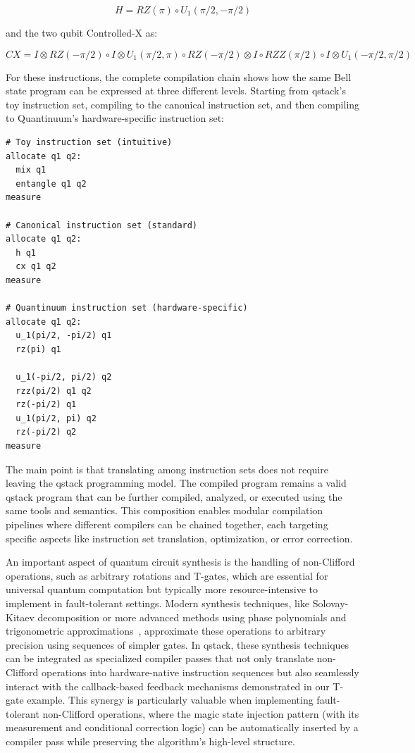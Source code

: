$$H =  RZ(\pi) \circ U_1(\pi/2, -\pi/2) $$

and the two qubit Controlled-X as:

$$CX = I \otimes RZ(-\pi/2) \circ I \otimes U_1(\pi/2, \pi) \circ RZ(-\pi/2) \otimes I \circ RZZ(\pi/2) \circ I \otimes U_1(-\pi/2, \pi/2)$$

For these instructions, the complete compilation chain shows how the same Bell state program can be expressed at three different levels. Starting from qstack's toy instruction set, compiling to the canonical instruction set, and then compiling to Quantinuum's hardware-specific instruction set:

\begin{verbatim}
# Toy instruction set (intuitive)
allocate q1 q2:
  mix q1
  entangle q1 q2
measure

# Canonical instruction set (standard)
allocate q1 q2:
  h q1
  cx q1 q2
measure

# Quantinuum instruction set (hardware-specific)
allocate q1 q2:
  u_1(pi/2, -pi/2) q1
  rz(pi) q1
  
  u_1(-pi/2, pi/2) q2
  rzz(pi/2) q1 q2
  rz(-pi/2) q1
  u_1(pi/2, pi) q2
  rz(-pi/2) q2
measure
\end{verbatim}

The main point is that translating among instruction sets does not require leaving the qstack programming model. The compiled program remains a valid qstack program that can be further compiled, analyzed, or executed using the same tools and semantics. This composition enables modular compilation pipelines where different compilers can be chained together, each targeting specific aspects like instruction set translation, optimization, or error correction.

An important aspect of quantum circuit synthesis is the handling of non-Clifford operations, such as arbitrary rotations and T-gates, which are essential for universal quantum computation but typically more resource-intensive to implement in fault-tolerant settings. Modern synthesis techniques, like Solovay-Kitaev decomposition or more advanced methods using phase polynomials and trigonometric approximations~\cite{dawson2005solovay,kliuchnikov2013asymptotically}, approximate these operations to arbitrary precision using sequences of simpler gates. In qstack, these synthesis techniques can be integrated as specialized compiler passes that not only translate non-Clifford operations into hardware-native instruction sequences but also seamlessly interact with the callback-based feedback mechanisms demonstrated in our T-gate example. This synergy is particularly valuable when implementing fault-tolerant non-Clifford operations, where the magic state injection pattern (with its measurement and conditional correction logic) can be automatically inserted by a compiler pass while preserving the algorithm's high-level structure.
